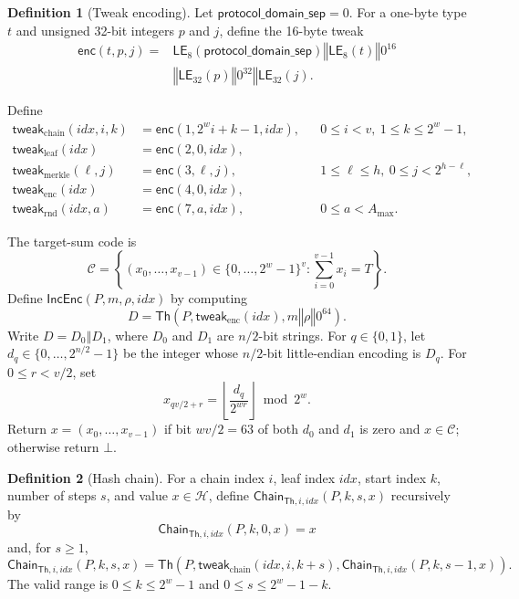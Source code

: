 \documentclass[11pt]{article}
\theoremstyle{definition}
\newtheorem{definition}{Definition}[section]
\theoremstyle{plain}
\theoremstyle{remark}
\newcommand{\Th}{\mathsf{Th}}
\newcommand{\IncEnc}{\mathsf{IncEnc}}
\newcommand{\Chain}{\mathsf{Chain}}
\newcommand{\LE}{\mathsf{LE}}
\newcommand{\concat}{\mathbin\Vert}
\newcommand{\idx}{\mathit{idx}}
\newcommand{\amax}{A_{\max}}
\begin{document}
\begin{definition}[Tweak encoding]
Let $\mathsf{protocol\_domain\_sep}=0$. For a one-byte type $t$ and unsigned 32-bit integers $p$ and $j$, define the 16-byte tweak
\[
\begin{aligned}
  \mathsf{enc}(t,p,j)={}&\LE_8(\mathsf{protocol\_domain\_sep})\concat\LE_8(t)\concat0^{16}\\
  &{}\concat\LE_{32}(p)\concat0^{32}\concat\LE_{32}(j).
\end{aligned}
\]
\end{definition}

Define
\[
\begin{aligned}
  \mathsf{tweak}_{\mathrm{chain}}(\idx,i,k) &= \mathsf{enc}(1,2^wi+k-1,\idx), &&0\leq i<v,\ 1\leq k\leq2^w-1,\\
  \mathsf{tweak}_{\mathrm{leaf}}(\idx) &= \mathsf{enc}(2,0,\idx),\\
  \mathsf{tweak}_{\mathrm{merkle}}(\ell,j) &= \mathsf{enc}(3,\ell,j), &&1\leq\ell\leq h,\ 0\leq j<2^{h-\ell},\\
  \mathsf{tweak}_{\mathrm{enc}}(\idx) &= \mathsf{enc}(4,0,\idx),\\
  \mathsf{tweak}_{\mathrm{rnd}}(\idx,a) &= \mathsf{enc}(7,a,\idx), &&0\leq a<\amax.
\end{aligned}
\]

The target-sum code is~\cite{DKKW25}
\[
  \mathcal C=\left\{(x_0,\ldots,x_{v-1})\in\{0,\ldots,2^w - 1\}^{v}:\sum_{i=0}^{v-1}x_i=T\right\}.
\]
Define $\IncEnc(P,m,\rho,\idx)$ by computing
\[
  D=\Th\!\left(P,\mathsf{tweak}_{\mathrm{enc}}(\idx),m\concat\rho\concat 0^{64}\right).
\]
Write $D=D_0\concat D_1$, where $D_0$ and $D_1$ are $n/2$-bit strings. For $q\in\{0,1\}$, let $d_q\in\{0,\ldots,2^{n/2}-1\}$ be the integer whose $n/2$-bit little-endian encoding is $D_q$. For $0\leq r<v/2$, set
\[
  x_{qv/2+r}=\left\lfloor\frac{d_q}{2^{wr}}\right\rfloor\bmod 2^w.
\]
Return $x=(x_0,\ldots,x_{v-1})$ if bit $wv/2=63$ of both $d_0$ and $d_1$ is zero and $x\in\mathcal C$; otherwise return $\bot$.

\begin{definition}[Hash chain]
For a chain index $i$, leaf index $\idx$, start index $k$, number of steps $s$, and value $x\in\mathcal H$, define $\Chain_{\Th,i,\idx}(P,k,s,x)$ recursively by
\[
  \Chain_{\Th,i,\idx}(P,k,0,x)=x
\]
and, for $s\geq1$,
\[
  \Chain_{\Th,i,\idx}(P,k,s,x)=\Th\!\left(P,\mathsf{tweak}_{\mathrm{chain}}(\idx,i,k+s),\Chain_{\Th,i,\idx}(P,k,s-1,x)\right).
\]
The valid range is $0\leq k\leq2^w-1$ and $0\leq s\leq2^w-1-k$.
\end{definition}
\end{document}
